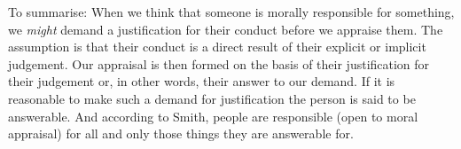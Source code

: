 \documentclass{article}
\begin{document}

To summarise:
When we think that someone is morally responsible for something, we
\textit{might} demand a justification for their conduct before we
appraise them. The assumption is that their conduct is a direct result of their
explicit or implicit judgement. Our appraisal is then formed on the basis of
their justification for their judgement or, in other words, their answer to our
demand. If it is reasonable to make such a demand for justification the person
is said to be answerable. And according to Smith, people are responsible (open
to moral appraisal) for all and only those things they are answerable for.

%
%
%
%
%
%
%
%
\end{document}
